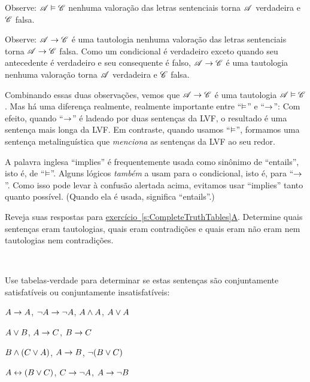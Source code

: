 Observe: $\mathscr{A} \vDash \mathscr{C}$ \ifeff{} nenhuma valoração das letras sentenciais torna $\mathscr{A}$ verdadeira e $\mathscr{C}$ falsa.

Observe: $\mathscr{A} \rightarrow \mathscr{C}$ é uma tautologia \ifeff{} nenhuma valoração das letras sentenciais torna $\mathscr{A} \rightarrow \mathscr{C}$ falsa. Como um condicional é verdadeiro exceto quando seu antecedente é verdadeiro e seu consequente é falso, $\mathscr{A} \rightarrow \mathscr{C}$ é uma tautologia \ifeff{} nenhuma valoração torna $\mathscr{A}$ verdadeira e $\mathscr{C}$ falsa.

Combinando essas duas observações, vemos que $\mathscr{A} \rightarrow \mathscr{C}$ é uma tautologia \ifeff{} $\mathscr{A} \vDash \mathscr{C}$. Mas há uma diferença realmente, realmente importante entre \textquotedblleft{}$\vDash$\textquotedblright{} e \textquotedblleft{}$\rightarrow$\textquotedblright{}:
Com efeito, quando \textquotedblleft{}$\rightarrow$\textquotedblright{} é ladeado por duas sentenças da LVF, o resultado é uma sentença mais longa da LVF. Em contraste, quando usamos \textquotedblleft{}$\vDash$\textquotedblright{}, formamos uma sentença metalinguística que \emph{menciona} as sentenças da LVF ao seu redor.

A palavra inglesa \textquotedblleft implies\textquotedblright{} é frequentemente usada como sinônimo de \textquotedblleft entails\textquotedblright{}, isto é, de \textquotedblleft{}$\vDash$\textquotedblright{}. Alguns lógicos \emph{também} a usam para o condicional, isto é, para \textquotedblleft{}$\rightarrow$\textquotedblright{}. Como isso pode levar à confusão alertada acima, evitamos usar \textquotedblleft implies\textquotedblright{} tanto quanto possível. (Quando ela é usada, significa \textquotedblleft entails\textquotedblright{}.)

\practiceproblems
\problempart
Reveja suas respostas para
\hyperref[pr.TT.TTorC]{exercício~\ref*{s:CompleteTruthTables}A}. Determine quais
sentenças eram tautologias, quais eram contradições e quais eram
não eram nem tautologias nem contradições.
\solutions

\

\problempart
\label{pr.TT.satisfiable}
Use tabelas-verdade para determinar se estas sentenças são conjuntamente satisfatíveis ou conjuntamente insatisfatíveis:
\begin{compactlist}
\item $A\rightarrow A$, $\neg A \rightarrow \neg A$, $A\wedge A$, $A\vee A$ %
\item $A\vee B$, $A\rightarrow C$, $B\rightarrow C$ %
\item $B\wedge(C\vee A)$, $A\rightarrow B$, $\neg(B\vee C)$  %
\item $A\leftrightarrow(B\vee C)$, $C\rightarrow \neg A$, $A\rightarrow \neg B$ %
\end{compactlist}



